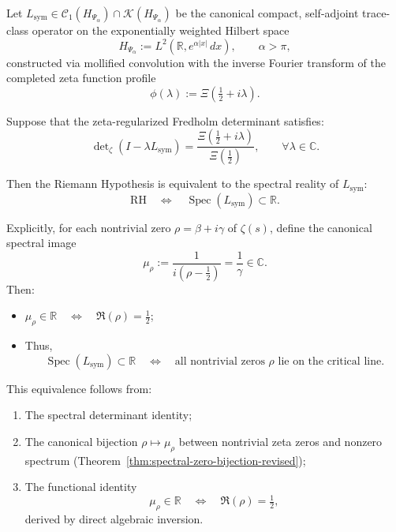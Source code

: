 \begin{theorem}
\label{thm:eq_of_rh}
Let \( L_{\mathrm{sym}} \in \mathcal{C}_1(H_{\Psi_\alpha}) \cap \mathcal{K}(H_{\Psi_\alpha}) \) be the canonical compact, self-adjoint trace-class operator on the exponentially weighted Hilbert space
\[
H_{\Psi_\alpha} := L^2(\mathbb{R}, e^{\alpha|x|} \, dx), \qquad \alpha > \pi,
\]
constructed via mollified convolution with the inverse Fourier transform of the completed zeta function profile
\[
\phi(\lambda) := \Xi\left( \tfrac{1}{2} + i\lambda \right).
\]

Suppose that the zeta-regularized Fredholm determinant satisfies:
\[
\det\nolimits_\zeta(I - \lambda L_{\mathrm{sym}}) = \frac{\Xi\left( \tfrac{1}{2} + i\lambda \right)}{\Xi\left( \tfrac{1}{2} \right)},
\qquad \forall \lambda \in \mathbb{C}.
\]

Then the Riemann Hypothesis is equivalent to the spectral reality of \( L_{\mathrm{sym}} \):
\[
\mathrm{RH} \quad \Longleftrightarrow \quad \operatorname{Spec}(L_{\mathrm{sym}}) \subset \mathbb{R}.
\]

\medskip

\noindent
Explicitly, for each nontrivial zero \( \rho = \beta + i\gamma \) of \( \zeta(s) \), define the canonical spectral image
\[
\mu_\rho := \frac{1}{i(\rho - \tfrac{1}{2})} = \frac{1}{\gamma} \in \mathbb{C}.
\]
Then:
\begin{itemize}
  \item \( \mu_\rho \in \mathbb{R} \quad \Longleftrightarrow \quad \Re(\rho) = \tfrac{1}{2} \);
  \item Thus,
  \[
  \operatorname{Spec}(L_{\mathrm{sym}}) \subset \mathbb{R} \quad \Longleftrightarrow \quad \text{all nontrivial zeros } \rho \text{ lie on the critical line.}
  \]
\end{itemize}

\medskip

\noindent
This equivalence follows from:
\begin{enumerate}
  \item The spectral determinant identity;
  \item The canonical bijection \( \rho \mapsto \mu_\rho \) between nontrivial zeta zeros and nonzero spectrum (Theorem~\ref{thm:spectral-zero-bijection-revised});
  \item The functional identity
  \[
  \mu_\rho \in \mathbb{R} \quad \Longleftrightarrow \quad \Re(\rho) = \tfrac{1}{2},
  \]
  derived by direct algebraic inversion.
\end{enumerate}
\end{theorem}
